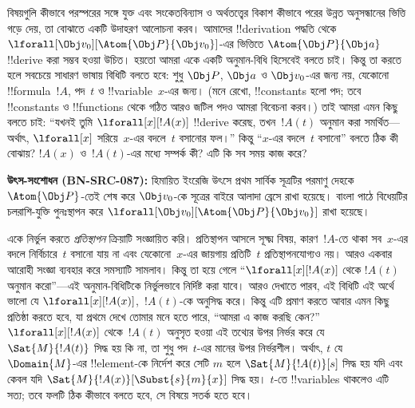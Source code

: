 \documentclass[../../../include/open-logic-section]{subfiles}
\begin{document}


বিষয়গুলি কীভাবে পরস্পরের সঙ্গে যুক্ত এবং সংকেতবিন্যাস ও অর্থতত্ত্বের
বিকাশ কীভাবে পরের উন্নত অনুসন্ধানের ভিত্তি গড়ে দেয়, তা বোঝাতে একটি
উদাহরণ আলোচনা করব। আমাদের !!{derivation} পদ্ধতি থেকে
$\lforall[\Obj v_0][\Atom{\Obj P}{\Obj v_0}]$-এর ভিত্তিতে
$\Atom{\Obj P}{\Obj a}$ !!{derive} করা সম্ভব হওয়া উচিত। হয়তো আমরা একে
একটি অনুমান-বিধি হিসেবেই বলতে চাই। কিন্তু তা করতে হলে সবচেয়ে সাধারণ
ভাষায় বিধিটি বলতে হবে: শুধু $\Obj P$, $\Obj a$ ও $\Obj v_0$-এর জন্য
নয়, যেকোনো !!{formula}~$!A$, পদ~$t$ ও !!{variable}~$x$-এর জন্য। (মনে
রেখো, !!{constant}s হলো পদ; তবে !!{constant}s ও !!{function}s থেকে গঠিত
আরও জটিল পদও আমরা বিবেচনা করব।) তাই আমরা এমন কিছু বলতে চাই: “যখনই তুমি
$\lforall[x][!A(x)]$ !!{derive} করেছ, তখন~$!A(t)$ অনুমান করা সমর্থিত—অর্থাৎ,
$\lforall[x]$ সরিয়ে~$x$-এর বদলে~$t$ বসানোর ফল।” কিন্তু “$x$-এর বদলে~$t$
বসানো” বলতে ঠিক কী বোঝায়? $!A(x)$ ও~$!A(t)$-এর মধ্যে সম্পর্ক কী? এটি
কি সব সময় কাজ করে?%
\par\smallskip\noindent\textnormal{\small\textbf{উৎস-সংশোধন (BN-SRC-087):} হিমায়িত ইংরেজি উৎসে প্রথম সার্বিক সূত্রটির পরমাণু দেহকে $\Atom{\Obj P}$-তেই শেষ করে $\Obj v_0$-কে সূত্রের বাইরে আলাদা ব্রেসে রাখা হয়েছে। বাংলা পাঠে বিধেয়টির চলরাশি-যুক্তি পুনঃস্থাপন করে $\lforall[\Obj v_0][\Atom{\Obj P}{\Obj v_0}]$ রাখা হয়েছে।} %

একে নির্ভুল করতে \emph{প্রতিস্থাপন} ক্রিয়াটি সংজ্ঞায়িত করি। প্রতিস্থাপন
আসলে সূক্ষ্ম বিষয়, কারণ~$!A$-তে থাকা সব~$x$-এর বদলে নির্বিচারে~$t$ বসানো
যায় না এবং যেকোনো~$x$-এর জায়গায় প্রতিটি~$t$ প্রতিস্থাপনযোগ্যও নয়।
আরও একবার আরোহী সংজ্ঞা ব্যবহার করে সমস্যাটি সামলাব। কিন্তু তা হয়ে গেলে
“$\lforall[x][!A(x)]$ থেকে $!A(t)$ অনুমান করো”—এই অনুমান-বিধিটিকে
নির্ভুলভাবে নির্দিষ্ট করা যাবে। আরও দেখাতে পারব, এই বিধিটি এই অর্থে ভালো
যে $\lforall[x][!A(x)]$,~$!A(t)$-কে অনুসিদ্ধ করে। কিন্তু এটি প্রমাণ করতে
আবার এমন কিছু প্রতিষ্ঠা করতে হবে, যা প্রথমে দেখে তোমার মনে হতে পারে,
“আমরা এ কাজ করছি কেন?” $\lforall[x][!A(x)]$ থেকে~$!A(t)$ অনুসৃত হওয়া
এই তথ্যের উপর নির্ভর করে যে $\Sat{M}{!A(t)}$ সিদ্ধ হয় কি না, তা শুধু
পদ~$t$-এর মানের উপর নির্ভরশীল। অর্থাৎ, $t$ যে~$\Domain{M}$-এর
!!{element}-কে নির্দেশ করে সেটি $m$ হলে $\Sat{M}{!A(t)}[s]$ সিদ্ধ হয়
যদি এবং কেবল যদি $\Sat{M}{!A(x)}[\Subst{s}{m}{x}]$ সিদ্ধ হয়। $t$-তে
!!{variable}s থাকলেও এটি সত্য; তবে ফলটি ঠিক কীভাবে বলতে হবে, সে বিষয়ে
সতর্ক হতে হবে।
\end{document}
